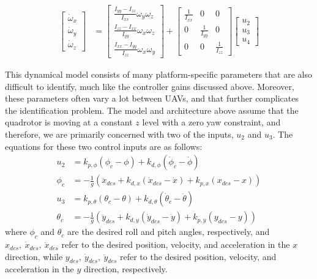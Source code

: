 \documentclass[letterpaper, 10 pt, conference]{ieeeconf}  %
\begin{document}
\begin{equation}
\begin{aligned}
	\begin{bmatrix}\dot{\omega}_{x} \\ \dot{\omega}_{y} \\ \dot{\omega}_{z}\end{bmatrix} &= \begin{bmatrix}\frac{I_{yy} - I_{zz}}{I_{xx}} \omega_{y}\omega_{z}\\ \frac{I_{zz} - I_{xx}}{I_{yy}} \omega_{x}\omega_{z} \\ \frac{I_{xx} - I_{yy}}{I_{zz}} \omega_{x}\omega_{y} \end{bmatrix} +  \begin{bmatrix}\frac{1}{I_{xx}} & 0 & 0\\ 0 & \frac{1}{I_{yy}} & 0\\ 0 & 0 & \frac{1}{I_{zz}}\end{bmatrix} \begin{bmatrix}u_{2} \\ u_{3} \\ u_{4} \end{bmatrix}
	\end{aligned}
\end{equation} 

This dynamical model consists of many platform-specific parameters that are also difficult to identify, much like the controller gains discussed above. Moreover, these parameters often vary a lot between UAVs, and that further complicates the identification problem. The model and architecture above assume that the quadrotor is moving at a constant $z$ level with a zero yaw constraint, and therefore, we are primarily concerned with two of the inputs, $u_2$ and $u_3$. The equations for these two control inputs are as follows:
\begin{align} \label{eq:cinputs}
    u_2 &= k_{p,\phi}(\phi_c-\phi) + k_{d,\phi}(\dot{\phi}_c - \dot{\phi}) \nonumber \\
    \phi_c &= -\frac{1}{g}(\ddot{x}_{des} + k_{d,x}(\dot{x}_{des}-\dot{x}) + k_{p,x}(x_{des}-x)) \nonumber \\
    u_3 &= k_{p,\theta}(\theta_c-\theta) + k_{d,\theta}(\dot{\theta}_c - \dot{\theta}) \nonumber \\
    \theta_c &= -\frac{1}{g}(\ddot{y}_{des} + k_{d,y}(\dot{y}_{des}-\dot{y}) + k_{p,y}(y_{des}-y))
\end{align}
where $\phi_c$ and $\theta_c$ are the desired roll and pitch angles, respectively, and $x_{des},~\dot{x}_{des},~\ddot{x}_{des}$ refer to the desired position, velocity, and acceleration in the $x$ direction, while $y_{des},~\dot{y}_{des},~\ddot{y}_{des}$ refer to the desired position, velocity, and acceleration in the $y$ direction, respectively.
\end{document}
